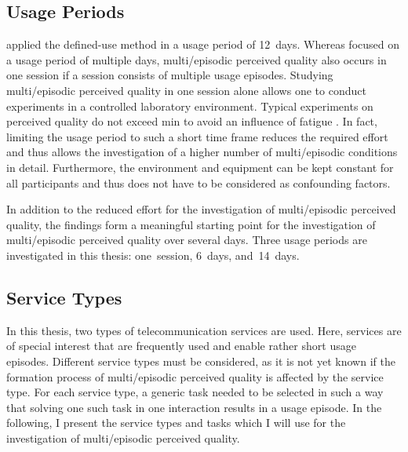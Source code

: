 \subsection{Usage Periods}
\citet{moller_single-call_2011} applied the defined-use method in a usage period of 12~days. 
Whereas \citet{moller_single-call_2011} focused on a usage period of multiple days, multi\-/episodic perceived quality also occurs in one session if a session consists of multiple usage episodes.
Studying multi\-/episodic perceived quality in one session alone allows one to conduct experiments in a controlled laboratory environment. %
Typical experiments on perceived quality do not exceed \unit[90]{min} to avoid an influence of fatigue \citep[\cf{}][]{schatz_impact_2012}.
In fact, limiting the usage period to such a short time frame reduces the required effort and thus allows the investigation of a higher number of multi\-/episodic conditions in detail.
Furthermore, the environment and equipment can be kept constant for all participants and thus does not have to be considered as confounding factors.

In addition to the reduced effort for the investigation of multi\-/episodic perceived quality, the findings form a meaningful starting point for the investigation of multi\-/episodic perceived quality over several days.
Three usage periods are investigated in this thesis: one~session, 6~days, and~14~days.

\subsection{Service Types}
In this thesis, two types of telecommunication services are used.
Here, services are of special interest that are frequently used and enable rather short usage episodes.
Different service types must be considered, as it is not yet known if the formation process of multi\-/episodic perceived quality is affected by the service type.
For each service type, a generic task needed to be selected in such a way that solving one such task in one interaction results in a usage episode.
In the following, I present the service types and tasks which I will use for the investigation of multi\-/episodic perceived quality.

